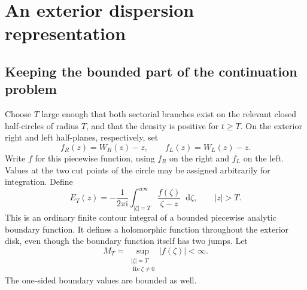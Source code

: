 \documentclass[11pt,a4paper]{article}
\theoremstyle{definition}
\numberwithin{equation}{section}
\newcommand{\dd}{\mathop{}\!\mathrm{d}}
\newcommand{\ii}{\mathrm{i}}
\begin{document}
\section{An exterior dispersion representation}
\label{sec:dispersion}

\subsection{Keeping the bounded part of the continuation problem}
Choose $T$ large enough that both sectorial branches exist on the relevant
closed half-circles of radius $T$, and that the density is positive for
$t\ge T$. On the exterior right and left half-planes, respectively, set
\begin{equation}
 f_R(z)=W_R(z)-z,\qquad f_L(z)=W_L(z)-z.
 \label{eq:fbranches}
\end{equation}
Write $f$ for this piecewise function, using $f_R$ on the right and $f_L$
on the left. Values at the two cut points of the circle may be assigned
arbitrarily for integration. Define
\begin{equation}
 E_T(z)=-\frac1{2\pi\ii}\int_{|\zeta|=T}^{\mathrm{ccw}}
                  \frac{f(\zeta)}{\zeta-z}\dd\zeta,
       \qquad |z|>T.
 \label{eq:Econtour}
\end{equation}
This is an ordinary finite contour integral of a bounded piecewise
analytic boundary function. It defines a holomorphic function throughout
the exterior disk, even though the boundary function itself has two jumps.
Let
\begin{equation}
 M_T=\sup_{\substack{|\zeta|=T\\\operatorname{Re}\zeta\ne0}}
                        |f(\zeta)|<\infty.
 \label{eq:MT}
\end{equation}
The one-sided boundary values are bounded as well.
\end{document}
